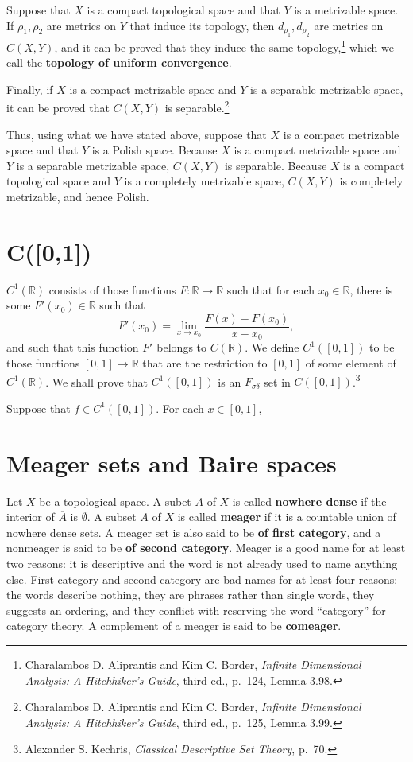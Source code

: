 \documentclass{article}
\theoremstyle{definition}
\theoremstyle{definition}
\begin{document}
Suppose that $X$ is a compact topological space and that $Y$ is a  metrizable space. 
If $\rho_1,\rho_2$ are metrics on $Y$ that induce its topology,
then $d_{\rho_1},d_{\rho_2}$ are metrics on $C(X,Y)$, and it can be proved
that they induce the same topology,\footnote{Charalambos D. 
Aliprantis and Kim C. Border, {\em Infinite Dimensional Analysis: A Hitchhiker's Guide}, third ed., p.~124,
Lemma 3.98.}  which we call the \textbf{topology of uniform convergence}. 


Finally, if $X$ is a compact metrizable space and $Y$ is a separable metrizable space, it can be proved that
$C(X,Y)$ is separable.\footnote{Charalambos D. 
Aliprantis and Kim C. Border, {\em Infinite Dimensional Analysis: A Hitchhiker's Guide}, third ed., p.~125,
Lemma 3.99.} 

Thus, using what we have stated above, suppose that $X$ is a compact metrizable space and that $Y$ is a Polish
space. Because $X$ is a compact metrizable space and $Y$ is a separable metrizable space, $C(X,Y)$
is separable. Because $X$ is a compact topological space and $Y$ is a completely metrizable space,
$C(X,Y)$ is completely metrizable, and hence Polish.


\section{C([0,1])}
$C^1(\mathbb{R})$ consists of those functions $F:\mathbb{R} \to \mathbb{R}$ such that for each $x_0 \in \mathbb{R}$, there is some 
$F'(x_0) \in \mathbb{R}$ such that
\[
F'(x_0)= \lim_{x \to x_0} \frac{F(x)-F(x_0)}{x-x_0},
\]
and such that this function $F'$ belongs to $C(\mathbb{R})$. We define $C^1([0,1])$ to be those functions $[0,1] \to \mathbb{R}$ that are the restriction
to $[0,1]$ of some element of $C^1(\mathbb{R})$. 
We shall prove that $C^1([0,1])$ is an $F_{\sigma \delta}$ set in $C([0,1])$.\footnote{Alexander S. Kechris, {\em Classical Descriptive Set Theory}, p.~70.}

Suppose that $f \in C^1([0,1])$. For each $x \in [0,1]$, 




\section{Meager sets and Baire spaces}
Let $X$ be a topological space.  A subet $A$ of $X$ is called \textbf{nowhere dense} if 
the interior of $\overline{A}$ is $\emptyset$. A subset $A$ of $X$ is called \textbf{meager} if it is a countable union of nowhere dense sets. A meager
set is also said to be \textbf{of first category}, and a nonmeager is said to be \textbf{of second category}.
Meager is a good name  for at least two reasons: it is descriptive and  the word is not already used to name anything else.
First category and second category are bad names for at least four reasons: the words describe nothing, they are phrases rather than single
words, they suggests an ordering, and they conflict with
reserving the word ``category'' for category theory. 
A complement of a meager  is said to be \textbf{comeager}. 
\end{document}
